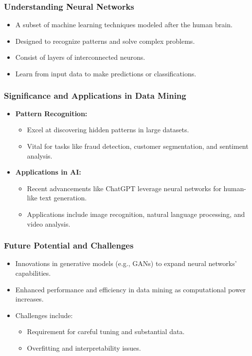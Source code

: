 \documentclass[aspectratio=169]{beamer}
\begin{document}
\begin{frame}[fragile]
    \frametitle{Understanding Neural Networks}
    \begin{itemize}
        \item A subset of machine learning techniques modeled after the human brain.
        \item Designed to recognize patterns and solve complex problems.
        \item Consist of layers of interconnected neurons.
        \item Learn from input data to make predictions or classifications.
    \end{itemize}
\end{frame}

\begin{frame}[fragile]
    \frametitle{Significance and Applications in Data Mining}
    \begin{itemize}
        \item \textbf{Pattern Recognition:} 
            \begin{itemize}
                \item Excel at discovering hidden patterns in large datasets.
                \item Vital for tasks like fraud detection, customer segmentation, and sentiment analysis.
            \end{itemize}
        \item \textbf{Applications in AI:}
            \begin{itemize}
                \item Recent advancements like ChatGPT leverage neural networks for human-like text generation.
                \item Applications include image recognition, natural language processing, and video analysis.
            \end{itemize}
    \end{itemize}
\end{frame}

\begin{frame}[fragile]
    \frametitle{Future Potential and Challenges}
    \begin{itemize}
        \item Innovations in generative models (e.g., GANs) to expand neural networks' capabilities.
        \item Enhanced performance and efficiency in data mining as computational power increases.
        \item Challenges include:
            \begin{itemize}
                \item Requirement for careful tuning and substantial data.
                \item Overfitting and interpretability issues.
            \end{itemize}
    \end{itemize}
\end{frame}
\end{document}
